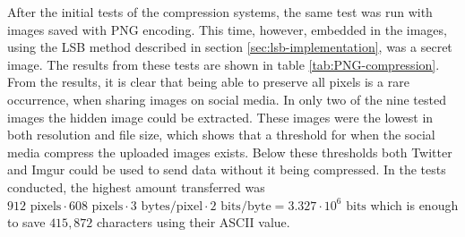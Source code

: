 After the initial tests of the compression systems, the same test was run with images saved with PNG encoding.
This time, however, embedded in the images, using the LSB method described in section \ref{sec:lsb-implementation}, was a secret image.
The results from these tests are shown in table \ref{tab:PNG-compression}.
From the results, it is clear that being able to preserve all pixels is a rare occurrence, when sharing images on social media.
In only two of the nine tested images the hidden image could be extracted.
These images were the lowest in both resolution and file size, which shows that a threshold for when the social media compress the uploaded images exists.
Below these thresholds both Twitter and Imgur could be used to send data without it being compressed.
In the tests conducted, the highest amount transferred was $912\text{ pixels} \cdot 608\text{ pixels} \cdot 3\text{ bytes/pixel} \cdot 2\text{ bits/byte} = 3.327\cdot 10^6\text{ bits}$ which is enough to save $415,872$ characters using their ASCII value.\\ 


